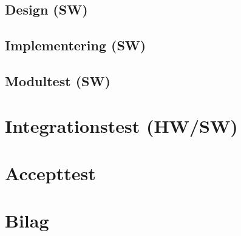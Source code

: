 \documentclass[11pt]{article}
\begin{document}
\subsection{Design (SW)}
\subsection{Implementering (SW)}
\subsection{Modultest (SW)}
\vfill
\pagebreak

\section{Integrationstest (HW/SW)}
\vfill
\pagebreak

\section{Accepttest}
\vfill
\pagebreak

\section{Bilag}
\vfill
\pagebreak
\end{document}

